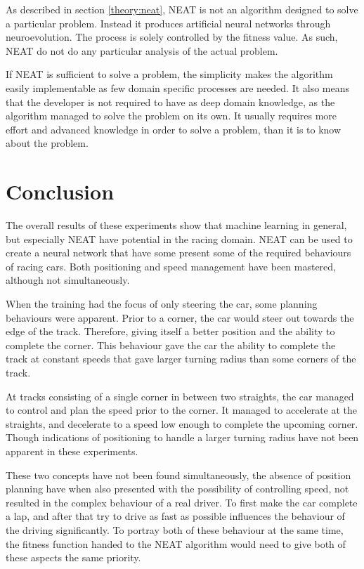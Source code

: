 As described in section \ref{theory:neat}, NEAT is not an algorithm designed to solve a particular problem. Instead it produces artificial neural networks through neuroevolution. The process is solely controlled by the fitness value. As such, NEAT do not do any particular analysis of the actual problem. 

If NEAT is sufficient to solve a problem, the simplicity makes the algorithm easily implementable as few domain specific processes are needed. It also means that the developer is not required to have as deep domain knowledge, as the algorithm managed to solve the problem on its own. It usually requires more effort and advanced knowledge in order to solve a problem, than it is to know about the problem.

\section{Conclusion}
\label{conclusion}
The overall results of these experiments show that machine learning in general, but especially NEAT have potential in the racing domain. NEAT can be used to create a neural network that have some present some of the required behaviours of racing cars. Both positioning and speed management have been mastered, although not simultaneously.

When the training had the focus of only steering the car, some planning behaviours were apparent. Prior to a corner, the car would steer out towards the edge of the track. Therefore, giving itself a better position and the ability to complete the corner. This behaviour gave the car the ability to complete the track at constant speeds that gave larger turning radius than some corners of the track.

At tracks consisting of a single corner in between two straights, the car managed to control and plan the speed prior to the corner. It managed to accelerate at the straights, and decelerate to a speed low enough to complete the upcoming corner. Though indications of positioning to handle a larger turning radius have not been apparent in these experiments.

These two concepts have not been found simultaneously, the absence of position planning have when also presented with the possibility of controlling speed, not resulted in the complex behaviour of a real driver. To first make the car complete a lap, and after that try to drive as fast as possible influences the behaviour of the driving significantly. To portray both of these behaviour at the same time, the fitness function handed to the NEAT algorithm would need to give both of these aspects the same priority.

